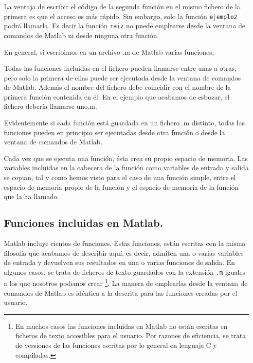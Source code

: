 La ventaja de escribir el código de la segunda función en el mismo fichero de la primera es que el acceso es más rápido. Sin embargo, solo la función \texttt{ejemplo2} podrá llamarla. Es decir la función \texttt{raiz} no puede emplearse desde la ventana de comandos de Matlab  ni desde ninguna otra función.

En general, si escribimos en un archivo .m de Matlab varias funciones,




Todas las funciones incluidas en el fichero pueden llamarse entre unas a otras, pero solo la primera de ellas puede ser ejecutada desde la ventana de comandos de Matlab. Además el nombre del fichero debe coincidir con el nombre de la primera función  contenida en él. En el ejemplo que acabamos de esbozar, el fichero debería llamarse uno.m.

Evidentemente si cada función está guardada en un fichero .m distinto, todas las funciones pueden en principio ser ejecutadas desde otra función o desde la ventana de comandos de Matlab.

Cada vez que se ejecuta una función, ésta crea su propio espacio de memoria. Las variables incluidas en la cabecera de la función como variables de entrada y salida se copian, tal y como hemos visto para el caso de una función simple, entre el espacio de memoria propio de la función y el espacio de memoria de la función que la ha llamado.

  
\subsection{Funciones incluidas en Matlab.} 
Matlab incluye cientos de funciones. Estas funciones, están escritas con la misma filosofía que acabamos de describir aquí, es decir, admiten una o varias variables de entrada y devuelven sus resultados en una o varias funciones de salida. En algunos casos, se trata de ficheros de texto  guardados con la extensión \texttt{.m} iguales a los que nosotros podemos crear \footnote{En muchos casos las funciones incluidas en Matlab no están escritas en ficheros de texto accesibles para el usuario. Por razones de eficiencia, se trata de versiones de las funciones escritas por lo general en lenguaje C y compiladas.}. La manera de emplearlas desde la ventana de comandos de Matlab es idéntica a la descrita para las funciones creadas por el usuario. 


